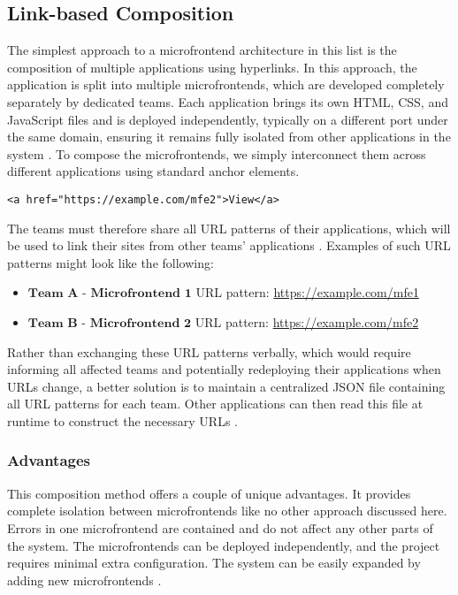 \subsection{Link-based Composition}
The simplest approach to a microfrontend architecture in this list is the composition of multiple applications using hyperlinks. In this approach, the application is split into multiple microfrontends, which are developed completely separately by dedicated teams. Each application brings its own HTML, CSS, and JavaScript files and is deployed independently, typically on a different port under the same domain, ensuring it remains fully isolated from other applications in the system \cite{Geers}. To compose the microfrontends, we simply interconnect them across different applications using standard anchor elements.
\begin{verbatim}
<a href="https://example.com/mfe2">View</a>
\end{verbatim}
The teams must therefore share all URL patterns of their applications, which will be used to link their sites from other teams' applications \cite{Geers}. Examples of such URL patterns might look like the following:
\begin{itemize}
\item $\textbf{Team A - Microfrontend 1}$ \newline
URL pattern: \url{https://example.com/mfe1}
\item $\textbf{Team B - Microfrontend 2}$ \newline
URL pattern: \url{https://example.com/mfe2}
\end{itemize}
Rather than exchanging these URL patterns verbally, which would require informing all affected teams and potentially redeploying their applications when URLs change, a better solution is to maintain a centralized JSON file containing all URL patterns for each team. Other applications can then read this file at runtime to construct the necessary URLs \cite{Geers}. 

\subsubsection{Advantages}
This composition method offers a couple of unique advantages. It provides complete isolation between microfrontends like no other approach discussed here. Errors in one microfrontend are contained and do not affect any other parts of the system. The microfrontends can be deployed independently, and the project requires minimal extra configuration. The system can be easily expanded by adding new microfrontends \cite{Geers}.

